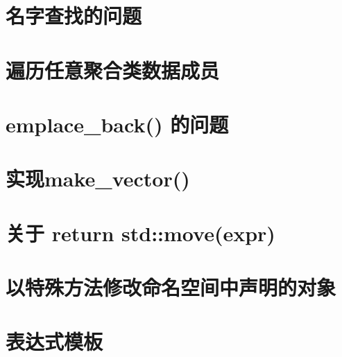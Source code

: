 \documentclass[11pt,fancyhdr]{ctexart}
\begin{document}
\section{名字查找的问题}


\section{遍历任意聚合类数据成员}


\section{emplace\_back() 的问题}


\section{实现make\_vector()}


\section{关于 return std::move(expr)}


\section{以特殊方法修改命名空间中声明的对象}


\section{表达式模板}

\end{document}
